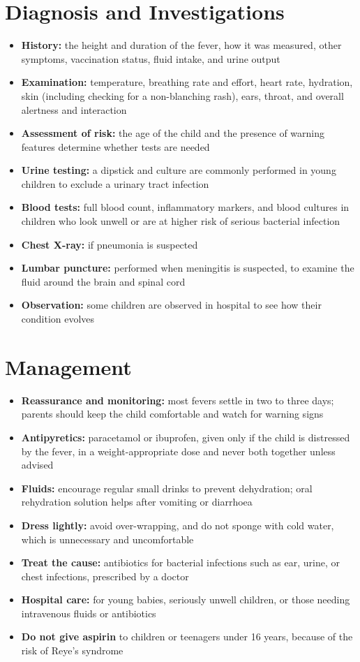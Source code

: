 \section*{Diagnosis and Investigations}
\begin{itemize}
    \item \textbf{History:} the height and duration of the fever, how it was measured, other symptoms, vaccination status, fluid intake, and urine output
    \item \textbf{Examination:} temperature, breathing rate and effort, heart rate, hydration, skin (including checking for a non-blanching rash), ears, throat, and overall alertness and interaction
    \item \textbf{Assessment of risk:} the age of the child and the presence of warning features determine whether tests are needed
    \item \textbf{Urine testing:} a dipstick and culture are commonly performed in young children to exclude a urinary tract infection
    \item \textbf{Blood tests:} full blood count, inflammatory markers, and blood cultures in children who look unwell or are at higher risk of serious bacterial infection
    \item \textbf{Chest X-ray:} if pneumonia is suspected
    \item \textbf{Lumbar puncture:} performed when meningitis is suspected, to examine the fluid around the brain and spinal cord
    \item \textbf{Observation:} some children are observed in hospital to see how their condition evolves
\end{itemize}

\section*{Management}
\begin{itemize}
    \item \textbf{Reassurance and monitoring:} most fevers settle in two to three days; parents should keep the child comfortable and watch for warning signs
    \item \textbf{Antipyretics:} paracetamol or ibuprofen, given only if the child is distressed by the fever, in a weight-appropriate dose and never both together unless advised
    \item \textbf{Fluids:} encourage regular small drinks to prevent dehydration; oral rehydration solution helps after vomiting or diarrhoea
    \item \textbf{Dress lightly:} avoid over-wrapping, and do not sponge with cold water, which is unnecessary and uncomfortable
    \item \textbf{Treat the cause:} antibiotics for bacterial infections such as ear, urine, or chest infections, prescribed by a doctor
    \item \textbf{Hospital care:} for young babies, seriously unwell children, or those needing intravenous fluids or antibiotics
    \item \textbf{Do not give aspirin} to children or teenagers under 16 years, because of the risk of Reye's syndrome
\end{itemize}

